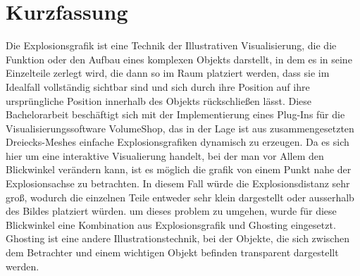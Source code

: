 %
%
%
%
%
%


\chapter*{Kurzfassung}

Die Explosionsgrafik ist eine Technik der Illustrativen Visualisierung, die die Funktion oder den Aufbau eines komplexen Objekts darstellt, in dem es in seine Einzelteile zerlegt wird, die dann so im Raum platziert werden, dass sie im Idealfall vollständig sichtbar sind und sich durch ihre Position auf ihre ursprüngliche Position innerhalb des Objekts rückschließen lässt. Diese Bachelorarbeit beschäftigt sich mit der Implementierung eines Plug-Ins für die Visualisierungssoftware VolumeShop, das in der Lage ist aus zusammengesetzten Dreiecks-Meshes einfache Explosionsgrafiken dynamisch zu erzeugen. Da es sich hier um eine interaktive Visualierung handelt, bei der man vor Allem den Blickwinkel verändern kann, ist es möglich die grafik von einem Punkt nahe der Explosionsachse zu betrachten. In diesem Fall würde die Explosionsdistanz sehr groß, wodurch die einzelnen Teile entweder sehr klein dargestellt oder ausserhalb des Bildes platziert würden. um dieses problem zu umgehen, wurde für diese Blickwinkel eine Kombination aus Explosionsgrafik und Ghosting eingesetzt. Ghosting ist eine andere Illustrationstechnik, bei der Objekte, die sich zwischen dem Betrachter und einem wichtigen Objekt befinden transparent dargestellt werden.